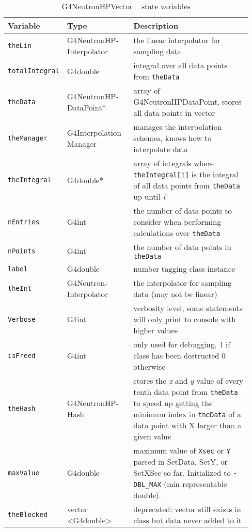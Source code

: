 \documentclass[12pt]{article}
\begin{document}
\begin{table}[h]
\caption{G4NeutronHPVector -- state variables}\label{Table_NeutronHPDataPointStateVariables}
\begin{tabularx}{\textwidth}{p{}p{}p{}}
\toprule
\bf Variable & \bf Type & \bf Description\\\midrule
\arrayrulecolor{lightgray}
\texttt{theLin} & G4NeutronHP-Interpolator & the linear interpolator for sampling data\\\hline
\texttt{totalIntegral} & G4double & integral over all data points from \texttt{theData}\\\hline
\texttt{theData} & G4NeutronHP-DataPoint* & array of G4NeutronHPDataPoint, stores all data points in vector\\\hline
\texttt{theManager} & G4Interpolation-Manager & manages the interpolation schemes, knows how to interpolate data\\\hline
\texttt{theIntegral} & G4double* & array of integrals where \texttt{theIntegral[i]} is the integral of all data points from \texttt{theData} up until \emph{i}\\\hline
\texttt{nEntries} & G4int & the number of data points to consider when performing calculations over \texttt{theData}\\\hline
\texttt{nPoints} & G4int & the number of data points in \texttt{theData} \\\hline
\texttt{label} & G4double & number tagging class instance\\\hline
\texttt{theInt} & G4Neutron-Interpolator & the interpolator for sampling data (may not be linear)\\\hline
\texttt{Verbose} & G4int & verbosity level, some statements will only print to console with higher values \\\hline
\texttt{isFreed} & G4int & only used for debugging, 1 if class has been destructed 0 otherwise\\\hline
\texttt{theHash} & G4NeutronHP-Hash & stores the \emph{x} and \emph{y} value of every tenth data point from \texttt{theData} to speed up getting the minimum index in \texttt{theData} of a data point with X larger than a given value \\\hline
\texttt{maxValue} & G4double & maximum value of \texttt{Xsec} or \texttt{Y} passed in SetData, SetY, or SetXSec so far. Initialized to \texttt{-DBL\_MAX} (min representable double).\\\hline
\texttt{theBlocked} & vector \textless G4double\textgreater & deprecated: vector still exists in class but data never added to it\\\hline

\end{tabularx}
\end{table}
\end{document}
